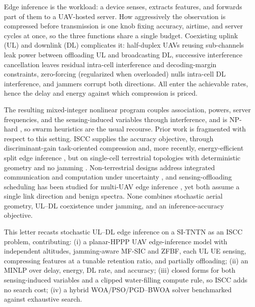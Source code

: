 \documentclass[journal]{IEEEtran}
\begin{document}
Edge inference is the workload: a device senses, extracts features, and forwards part of them to a UAV-hosted server. How aggressively the observation is compressed before transmission is one knob fixing accuracy, airtime, and server cycles at once, so the three functions share a single budget. Coexisting uplink (UL) and downlink (DL) complicates it: half-duplex UAVs reusing sub-channels leak power between offloading UL and broadcasting DL, successive interference cancellation leaves residual intra-cell interference and decoding-margin constraints, zero-forcing (regularized when overloaded) nulls intra-cell DL interference, and jammers corrupt both directions. All enter the achievable rates, hence the delay and energy against which compression is priced.

The resulting mixed-integer nonlinear program couples association, powers, server frequencies, and the sensing-induced variables through interference, and is NP-hard \cite{Hoang_TCOM_2024}, so swarm heuristics \cite{book_SI2010,genetic_optim} are the usual recourse. Prior work is fragmented with respect to this setting. ISCC supplies the accuracy objective, through discriminant-gain task-oriented compression \cite{wen2024iscc} and, more recently, energy-efficient split edge inference \cite{yao2025edgeinf}, but on single-cell terrestrial topologies with deterministic geometry and no jamming \cite{wen2025survey}. Non-terrestrial designs address integrated communication and computation under uncertainty \cite{tang2025ntn}, and sensing-offloading scheduling has been studied for multi-UAV edge inference \cite{du2026uavinf}, yet both assume a single link direction and benign spectra. None combines stochastic aerial geometry, UL--DL coexistence under jamming, and an inference-accuracy objective.

This letter recasts stochastic UL--DL edge inference on a SI-TNTN as an ISCC problem, contributing: (i) a planar-HPPP UAV edge-inference model with independent altitudes, jamming-aware MF-SIC and ZFBF, each UL UE sensing, compressing features at a tunable retention ratio, and partially offloading; (ii) an MINLP over delay, energy, DL rate, and accuracy; (iii) closed forms for both sensing-induced variables and a clipped water-filling compute rule, so ISCC adds no search cost; (iv) a hybrid {\color{blue}WOA/PSO/PGD}--BWOA solver benchmarked against exhaustive search.
\end{document}
